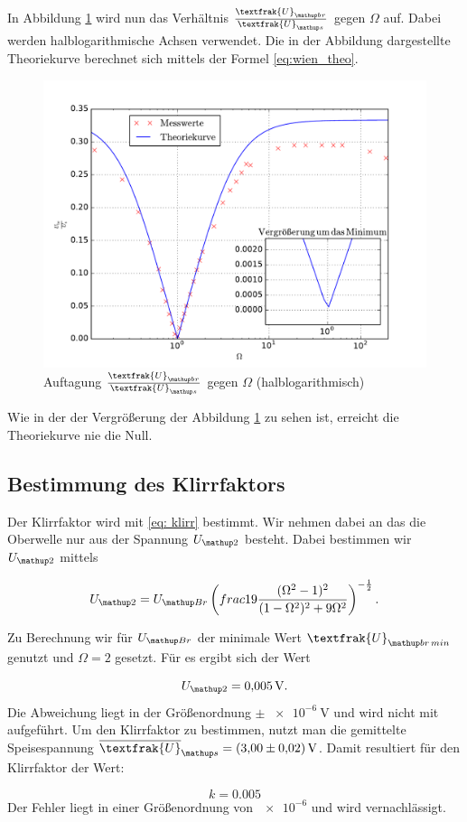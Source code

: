 In Abbildung \ref{fig: plot}
wird nun das Verhältnis $\frac{\textfrak{U}\ua{br}}{\textfrak{U}\ua{s}}$
gegen $\Omega$ auf. Dabei werden halblogarithmische Achsen verwendet. %
Die in der Abbildung dargestellte Theoriekurve berechnet sich mittels der Formel
\eqref{eq:wien_theo}.

\begin{figure}
  \centering
  \includegraphics[width=1\textwidth]{pics/ub_us.pdf}
  \caption{Auftagung $\frac{\textfrak{U}\ua{br}}{\textfrak{U}\ua{s}}$  gegen $\Omega$ (halblogarithmisch) }
  \label{fig: plot}
\end{figure}

Wie in der der Vergrößerung der Abbildung \ref{fig: plot} zu sehen ist, erreicht die %
Theoriekurve nie die Null.

\subsection{Bestimmung des Klirrfaktors}

Der Klirrfaktor wird mit \eqref{eq: klirr} bestimmt.
Wir nehmen dabei an das die Oberwelle nur aus der Spannung $U\ua{2}$ besteht. %
Dabei bestimmen wir $U\ua{2}$ mittels

\begin{equation*}
 U\ua{2}=U\ua{Br}\left(frac{1}{9} \frac{(\Omega^2 - 1)^2 }{(1 - \Omega ^2)^2 + 9 \Omega ^2}\right)^{-\frac{1}{2}}.
\end{equation*}

Zu Berechnung wir für $U\ua{Br}$ der minimale Wert $\textfrak{U}\ua{br\,min}$ %
genutzt und $\Omega=2$ gesetzt.
Für es ergibt sich der Wert %

\begin{equation*}
 U\ua{2}=\SI{0.005}{\volt}.
\end{equation*}
Die Abweichung liegt in der Größenordnung $\pm \, \SI{e-6}{\volt}$ und
wird nicht mit aufgeführt.
Um den Klirrfaktor zu bestimmen, nutzt man die gemittelte Speisespannung
$\overline{\textfrak{U}}\ua{s}=\SI{3.0\pm0.02}{\volt}$.
Damit resultiert für den Klirrfaktor der Wert:

\begin{equation*}
k=0.005
\end{equation*}
Der Fehler liegt in einer Größenordnung von $\num{e-6}$ und wird vernachlässigt.
